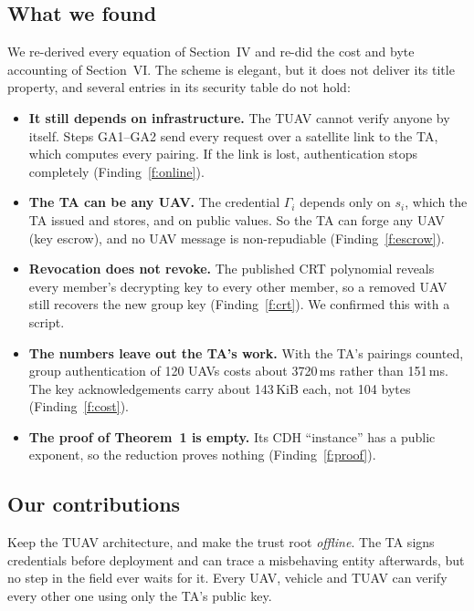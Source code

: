 \subsection{What we found}
We re-derived every equation of Section~IV and re-did the cost and byte accounting of Section~VI. The scheme is elegant, but it
does not deliver its title property, and several entries in its security table do not hold:
\begin{itemize}
  \item \textbf{It still depends on infrastructure.} The TUAV cannot verify anyone by itself. Steps GA1--GA2 send every request over a
        satellite link to the TA, which computes every pairing. If the link is lost, authentication stops completely (Finding~\ref{f:online}).
  \item \textbf{The TA can be any UAV.} The credential $\Gamma_i$ depends only on $s_i$, which the TA issued and stores, and on public
        values. So the TA can forge any UAV (key escrow), and no UAV message is non-repudiable (Finding~\ref{f:escrow}).
  \item \textbf{Revocation does not revoke.} The published CRT polynomial reveals every member's decrypting key to every other member, so a
        removed UAV still recovers the new group key (Finding~\ref{f:crt}). We confirmed this with a script.
  \item \textbf{The numbers leave out the TA's work.} With the TA's pairings counted, group authentication of 120 UAVs costs about 3720\,ms
        rather than 151\,ms. The key acknowledgements carry about 143\,KiB each, not 104 bytes (Finding~\ref{f:cost}).
  \item \textbf{The proof of Theorem~1 is empty.} Its CDH ``instance'' has a public exponent, so the reduction proves nothing (Finding~\ref{f:proof}).
\end{itemize}

\subsection{Our contributions}
\begin{keybox}
Keep the TUAV architecture, and make the trust root \emph{offline}. The TA signs credentials before deployment and can trace a
misbehaving entity afterwards, but no step in the field ever waits for it. Every UAV, vehicle and TUAV can verify every other one
using only the TA's public key.
\end{keybox}

